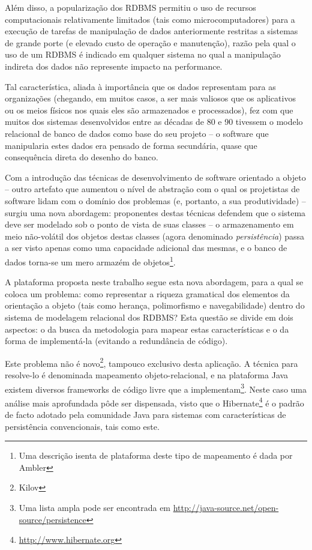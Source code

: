 \documentclass{abnt}
\begin{document}
Além disso, a popularização dos RDBMS permitiu o uso de recursos computacionais relativamente limitados (tais como microcomputadores) para a execução de tarefas de manipulação de dados anteriormente restritas a sistemas de grande porte (e elevado custo de operação e manutenção), razão pela qual o uso de um RDBMS é indicado em qualquer sistema no qual a manipulação indireta dos dados não represente impacto na performance.

Tal característica, aliada à importância que os dados representam para as organizações (chegando, em muitos casos, a ser mais valiosos que os aplicativos ou os meios físicos nos quais eles são armazenados e processados), fez com que muitos dos sistemas desenvolvidos entre as décadas de 80 e 90 tivessem o modelo relacional de banco de dados como base do seu projeto – o software que manipularia estes dados era pensado de forma secundária, quase que consequência direta do desenho do banco.

Com a introdução das técnicas de desenvolvimento de software orientado a objeto – outro artefato que aumentou o nível de abstração com o qual os projetistas de software lidam com o domínio dos problemas (e, portanto, a sua produtividade) – surgiu uma nova abordagem: proponentes destas técnicas defendem que o sistema deve ser modelado sob o ponto de vista de suas classes – o armazenamento em meio não-volátil dos objetos destas classes (agora denominado \textit{persistência}) passa a ser visto apenas como uma capacidade adicional das mesmas, e o banco de dados torna-se um mero armazém de objetos\footnote{Uma descrição isenta de plataforma deste tipo de mapeamento é dada por Ambler\cite{web:ambler}}.

A plataforma proposta neste trabalho segue esta nova abordagem, para a qual se coloca um problema: como representar a riqueza gramatical dos elementos da orientação a objeto (tais como herança, polimorfismo e navegabilidade) dentro do sistema de modelagem relacional dos RDBMS? Esta questão se divide em dois aspectos: o da busca da metodologia para mapear estas características e o da forma de implementá-la (evitando a redundância de código).

	Este problema não é novo\footnote{Kilov}, tampouco exclusivo desta aplicação. A técnica para resolve-lo é denominada mapeamento objeto-relacional, e na plataforma Java existem diversos frameworks de código livre que a implementam\footnote{Uma lista ampla pode ser encontrada em \url{http://java-source.net/open-source/persistence}}. Neste caso uma análise mais aprofundada pôde ser dispensada, visto que o Hibernate\footnote{\url{http://www.hibernate.org}} é o padrão de facto adotado pela comunidade Java para sistemas com características de persistência convencionais, tais como este.
\end{document}

